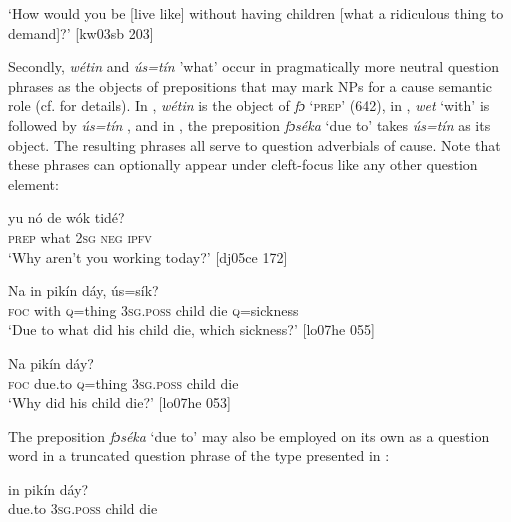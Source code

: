 \glt ‘How would you be [live like] without having children 
[what a ridiculous thing to demand]?’ [kw03sb 203]
\z

Secondly, \textit{wétin} and \textit{ús=tín} ’what’ occur in pragmatically more neutral question phrases as the objects of prepositions that may mark NPs for a cause semantic role \is{}(cf.  for details). In , \textit{wétin} is the object of \textit{fɔ} \textsc{‘prep’} \textsc{(642}), in \textsc{,} \textit{wet} ‘with’ is followed by \textit{ús=tín} , and in , the preposition \textit{fɔséka} ‘due to’ takes \textit{ús=tín} as its object. The resulting phrases all serve to question adverbials of cause. Note that these phrases can optionally appear under cleft-focus like any other question element: 


\ea%
    \label{ex:key:642}
    \gll {}    yu  nó  de  wók    tidé?\\
\textsc{prep}\textstylePichitranslationZchn{} what\textstylePichitranslationZchn{} \textsc{2sg}\textstylePichitranslationZchn{} \textsc{neg}\textstylePichitranslationZchn{} \textsc{ipfv}\\

\glt ‘Why aren’t you working today?’ [dj05ce 172]
\z


\ea%
    \label{ex:key:643}
    \gll Na        in    pikín  dáy,    ús=sík?\\
\textsc{foc}  with    \textsc{q}=thing  \textsc{3sg.poss}  child  die    \textsc{q}=sickness\\

\glt ‘Due to what did his child die, which sickness?’ [lo07he 055]
\z


\ea%
    \label{ex:key:644}
    \gll Na       pikín  dáy?\\
\textsc{foc}  due.to  \textsc{q}=thing  \textsc{3sg.poss}  child  die\\

\glt ‘Why did his child die?’ [lo07he 053]
\z

The preposition \textit{fɔséka} ‘due to’ may also be employed on its own as a question word in a truncated question phrase of the type presented in :


\ea%
    \label{ex:key:645}
    \gll {}  in    pikín  dáy?\\
due.to  \textsc{3sg.poss}  child  die\\

